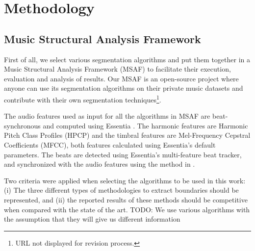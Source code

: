 \documentclass{article}
\begin{document}



\section{Methodology}\label{sec:prelExp}

\subsection{Music Structural Analysis Framework}

First of all, we select various segmentation algorithms and put them together in a Music Structural Analysis Framework (MSAF) to facilitate their execution, evaluation and analysis of results. 
Our MSAF is an open-source project where anyone can use its segmentation algorithms on their private music datasets and contribute with their own segmentation techniques\footnote{URL not displayed for revision process.}.


The audio features used as input for all the algorithms in MSAF are beat-synchronous and computed using Essentia \cite{Bogdanov2013}.
The harmonic features are Harmonic Pitch Class Profiles (HPCP) and the timbral features are Mel-Frequency Cepstral Coefficients (MFCC), both features calculated using Essentia's default parameters.
The beats are detected using Essentia's multi-feature beat tracker, and synchronized with the audio features using the method in \cite{Ellis2007}.

Two criteria were applied when selecting the algorithms to be used in this work: (i) The three different types of methodologies to extract boundaries should be represented, and (ii) the reported results of these methods should be competitive when compared with the state of the art.
TODO: We use various algorithms with the assumption that they will give us different information
\end{document}
